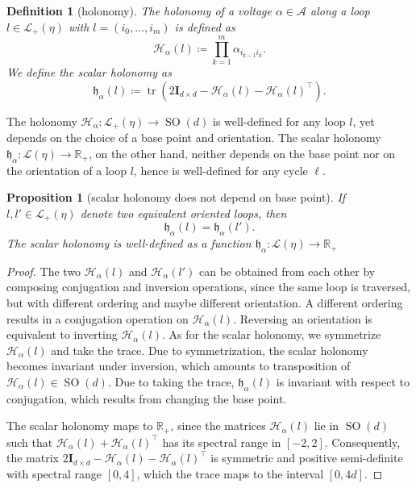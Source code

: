 \documentclass[10pt,reqno]{amsart}
\numberwithin{equation}{section}
\theoremstyle{bfnote}
\newtheorem{proposition}[theorem]{Proposition}
\theoremstyle{bfdef}
\newtheorem{definition}[theorem]{Definition}
\newcommand{\mc}[1]{\mathcal{#1}}
\newcommand{\mfk}[1]{\mathfrak{#1}}
\newcommand{\R}{\mathbb{R}}
\newcommand{\II}{\mathbf{I}_{d \times d}}
\DeclareMathOperator{\SO}{SO}
\DeclareMathOperator{\tr}{tr}
\providecommand\a; %
\renewcommand{\a}{\alpha}
\providecommand\Hol; %
\renewcommand{\Hol}{\mc{H}}
\providecommand\Lps; %
\renewcommand{\Lps}{\mc{L}}
\providecommand\hol; %
\renewcommand{\hol}{\mathfrak{h}}
\begin{document}
	\begin{definition}[holonomy]\label{def:holonomy}
		The \textit{holonomy} of a voltage $\a \in \mc{A}$ along a loop $l\in \Lps_{+}(\eta)$ with $l = (i_{0},\dots,i_{m})$ is defined as
		\begin{equation}
			\Hol_{\a}(l) \coloneqq \prod_{k=1}^m \a_{i_{k - 1} i_{k}}.
		\end{equation}
		We define the \textit{scalar holonomy} as
		\begin{equation}
			\mfk{h}_\a(l) \coloneqq \tr(2 \II - \Hol_{\a}(l) - \Hol_{\a}(l)^{\top}).
		\end{equation}
	\end{definition}
	The holonomy $\Hol_{\a} : \Lps_+(\eta) \to \SO(d)$ is well-defined for any loop $l$, yet depends on the choice of a base point and orientation. The scalar holonomy $\mfk{h}_\a\colon \Lps(\eta) \to\mathbb{R}_{+}$, on the other hand, neither depends on the base point nor on the orientation of a loop $l$, hence is well-defined for any cycle $\ell$.

	\begin{proposition}[scalar holonomy does not depend on base point]\label{prop:scalar-hol-basepoint}
		If $l,l' \in \Lps_+(\eta)$ denote two equivalent oriented loops, then
		\begin{equation}
			\hol_{\a}(l) = \hol_{\a}(l').
		\end{equation}
		The scalar holonomy is well-defined as a function $\hol_{\a}: \Lps(\eta) \to \R_+$
	\end{proposition}
	\begin{proof}
		The two $\Hol_{\a}(l)$ and $\Hol_{\a}(l')$ can be obtained from each other by composing conjugation and inversion operations, since the same loop is traversed, but with different ordering and maybe different orientation.
		A different ordering results in a conjugation operation on $\Hol_{\a}(l)$. Reversing an orientation is equivalent to inverting $\Hol_{\a}(l)$.
		As for the scalar holonomy, we symmetrize $\Hol_{\a}(l)$ and take the trace. Due to symmetrization, the scalar holonomy becomes invariant under inversion, which amounts to transposition of $\Hol_{\a}(l) \in \SO(d)$. Due to taking the trace, $\hol_{\a}(l)$ is invariant with respect to conjugation, which results from changing the base point.

		The scalar holonomy maps to $\R_{+}$, since the matrices $\Hol_{\a}(l)$ lie in $\SO(d)$ such that $\Hol_{\a}(l) + \Hol_{\a}(l)^{\top}$ has its spectral range in $[-2,2]$. Consequently, the matrix $2 \II - \Hol_{\a}(l) - \Hol_{\a}(l)^{\top}$ is symmetric and positive semi-definite with spectral range $[0,4]$, which the trace maps to the interval $[0,4d]$.
	\end{proof}
\end{document}
